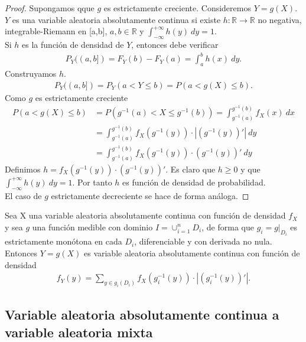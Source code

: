 \begin{proof}
Supongamos qque $g$ es estrictamente creciente. Consideremos $Y = g(X)$. $Y$ es una variable aleatoria absolutamente continua si existe $h: \mathbb{R} \longrightarrow \mathbb{R}$ no negativa, integrable-Riemann en [a,b], $a,b \in \mathbb{R}$ y $\int_{-\infty}^{+\infty}{h(y) \ dy} = 1$.
\\
\newline
Si $h$ es la función de densidad de $Y$, entonces debe verificar
\begin{align*}
    P_Y((a,b]) = F_Y(b) - F_Y(a) = \int_{a}^{b}{h(x) \ dy}.
\end{align*}
Construyamos $h$.
\begin{align*}
    P_Y((a,b]) = P_Y(a < Y \leq b) = P(a < g(X) \leq b).
\end{align*}
Como $g$ es estrictamente creciente
\begin{align*}
    P(a < g(X) \leq b) &= P(g^{-1}(a) < X \leq g^{-1}(b)) = \int_{g^{-1}(a)}^{g^{-1}(b)}{f_X(x) \ dx}\\
    & = \int_{g^{-1}(a)}^{g^{-1}(b)}{f_X(g^{-1}(y)) \cdot |(g^{-1}(y))'|\ dy} \\
    & = \int_{g^{-1}(a)}^{g^{-1}(b)}{f_X(g^{-1}(y)) \cdot (g^{-1}(y))'\ dy}
\end{align*}
Definimos $h = f_X(g^{-1}(y)) \cdot (g^{-1}(y))'$. Es claro que $h \ge 0$ y que $\int_{-\infty}^{+\infty}{h(y) \ dy} = 1$. Por tanto $h$ es función de densidad de probabilidad.
\\
\newline
El caso de $g$ estrictamente decreciente se hace de forma análoga.
\end{proof}

\begin{teo}
Sea X una variable aleatoria absolutamente continua con función de densidad $f_X$ y sea $g$ una función medible con dominio $I = \cup_{i=1}^{n}{D_i}$, de forma que $g_i = g|_{D_i}$ es estrictamente monótona en cada $D_i$, diferenciable y con derivada no nula. Entonces $Y = g(X)$ es variable aleatoria absolutamente continua con función de densidad
\begin{align*}
    f_Y(y) = \sum_{y \in g_i(D_i)}{f_X(g_i^{-1}(y)) \cdot |(g_i^{-1}(y))'|}.
\end{align*}
\end{teo}

\subsection{Variable aleatoria absolutamente continua a variable aleatoria mixta}

